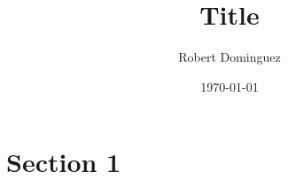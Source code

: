 \documentclass[12pt]{article}
\author{Robert Dominguez}
\date{\today}
\title{Title}
\begin{document}
\maketitle


\section{Section 1}

\end{document}
